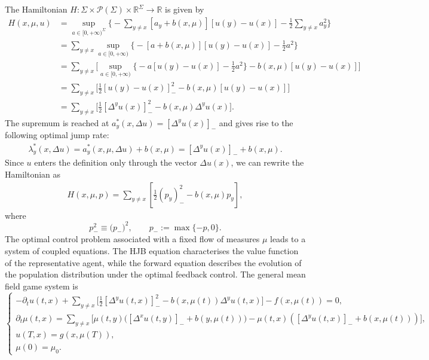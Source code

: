 \documentclass[11pt,a4paper]{amsart}
\theoremstyle{definition}
\newcommand{\calP}{\mathcal{P}}
\newcommand{\R}{\mathbb{R}}
\begin{document}
The Hamiltonian $H \colon \Sigma \times \calP(\Sigma) \times \R^{\Sigma} \to \R$ is given by
\begin{align*}
    H(x,\mu,u)
    &= \sup_{a\in[0,+\infty)^\Sigma} \Bigg\{-\sum_{y \neq x}[a_{y} + b(x,\mu)] [u(y) - u(x)] - \frac{1}{2}\sum_{y \neq x} a_{y}^2\Bigg\} \\
    &= \sum_{y \neq x} \sup_{a\in[0,+\infty)} \Big\{-[a + b(x,\mu)][u(y) - u(x)] - \frac{1}{2} a^2\Big\} \\
    &= \sum_{y \neq x} \Bigg[\sup_{a\in[0,+\infty)} \Big\{-a[u(y) - u(x)] - \frac{1}{2}a^2\Big\} - b(x,\mu)[u(y) - u(x)]\Bigg] \\
    &= \sum_{y \neq x} \Bigg[\frac{1}{2}[u(y) - u(x)]_{-}^2 - b(x,\mu)[u(y) - u(x)]\Bigg] \\
    &= \sum_{y \neq x} \Bigg[\frac{1}{2}[\Delta^y u(x)]_{-}^2 - b(x,\mu) {\Delta^y}u(x)\Bigg].
\end{align*}
The supremum is reached at $a_y^*(x,\Delta u) = [\Delta^{y}u(x)]_{-}$ and gives rise to the following optimal jump rate:
\begin{align*}
    \lambda_y^*(x,\Delta u) = a_y^*(x,\mu,\Delta u) + b(x,\mu) = [\Delta^{y}u(x)]_{-} + b(x,\mu).
\end{align*}
Since $u$ enters the definition only through the vector $\Delta u(x)$, we can rewrite the Hamiltonian as
\begin{align*}
    H(x,\mu,p) = \sum_{y \neq x} \left[\frac{1}{2}(p_y)_{-}^{2} - b(x,\mu)p_y\right],
\end{align*}
where 
\[ 
p_-^2 \equiv \bigl(p_-\bigr)^2,\qquad p_-:=\max\{-p,0\}. 
\]
The optimal control problem associated with a fixed flow of measures $\mu$ leads to a system of coupled equations. The HJB equation characterises the value function of the representative agent, while the forward equation describes the evolution of the population distribution under the optimal feedback control.
The general mean field game system is
% 
\begin{equation}\label{eqn:MFG system}
    \begin{cases}
        -\partial_t u(t,x) 
        + \displaystyle\sum_{y \neq x} 
        \bigg[
        \frac{1}{2} [\Delta^y u(t,x)]^2_- 
        - b(x,\mu(t))\Delta^y u(t,x) 
        \bigg]
        - f(x,\mu(t)) 
        = 0, \\
        \partial_t \mu(t,x) 
        = \displaystyle\sum_{y \neq x} 
        \Big[
        \mu(t,y) \big( [\Delta^{x}u(t,y)]_{-} + b(y,\mu(t)) \big)
        - \mu(t,x) \left( [\Delta^{y}u(t,x)]_{-} + b(x,\mu(t)) \right)
        \Big],\\
        u(T,x) = g(x,\mu(T)), \\
        \mu(0) = \mu_{0}.
    \end{cases}
\end{equation}
\end{document}
